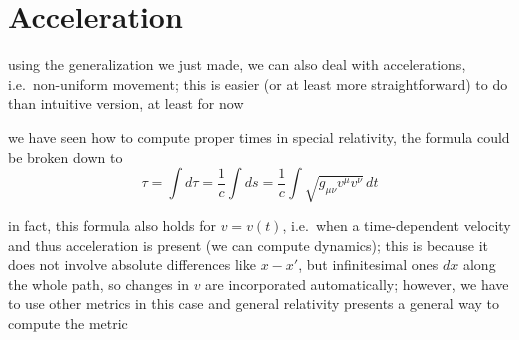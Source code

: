 	\section{Acceleration}%
using the generalization we just made, we can also deal with accelerations, i.e.~non-uniform movement; this is easier (or at least more straightforward) to do than intuitive version, at least for now


we have seen how to compute proper times in special relativity, the formula could be broken down to 
\begin{equation}
\tau = \int d\tau = \frac{1}{c} \int ds = \frac{1}{c} \int \sqrt{g_{\mu \nu} v^\mu v^\nu} \, dt
\end{equation}

in fact, this formula also holds for $v = v(t)$, i.e.~when a time-dependent velocity and thus acceleration is present (we can compute dynamics); this is because it does not involve absolute differences like $x - x'$, but infinitesimal ones $dx$ along the whole path, so changes in $v$ are incorporated automatically; however, we have to use other metrics in this case and general relativity presents a general way to compute the metric




